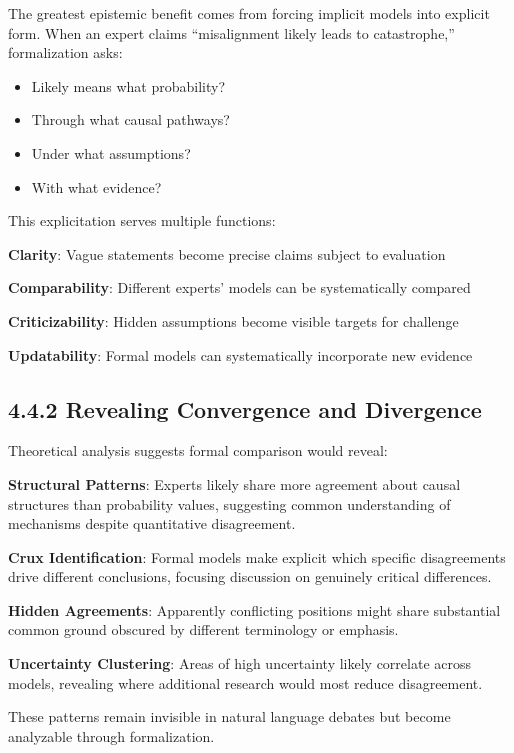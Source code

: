 \documentclass[
  11pt,
  letterpaper,
  openany]{book}
\providecommand{\tightlist}{%
  \setlength{\itemsep}{0pt}\setlength{\parskip}{0pt}}
\begin{document}
The greatest epistemic benefit comes from forcing implicit models into
explicit form. When an expert claims ``misalignment likely leads to
catastrophe,'' formalization asks:

\begin{itemize}
\tightlist
\item
  Likely means what probability?
\item
  Through what causal pathways?
\item
  Under what assumptions?
\item
  With what evidence?
\end{itemize}

This explicitation serves multiple functions:

\textbf{Clarity}: Vague statements become precise claims subject to
evaluation

\textbf{Comparability}: Different experts' models can be systematically
compared

\textbf{Criticizability}: Hidden assumptions become visible targets for
challenge

\textbf{Updatability}: Formal models can systematically incorporate new
evidence

\subsection{4.4.2 Revealing Convergence and
Divergence}\label{sec-convergence-divergence}

Theoretical analysis suggests formal comparison would reveal:

\textbf{Structural Patterns}: Experts likely share more agreement about
causal structures than probability values, suggesting common
understanding of mechanisms despite quantitative disagreement.

\textbf{Crux Identification}: Formal models make explicit which specific
disagreements drive different conclusions, focusing discussion on
genuinely critical differences.

\textbf{Hidden Agreements}: Apparently conflicting positions might share
substantial common ground obscured by different terminology or emphasis.

\textbf{Uncertainty Clustering}: Areas of high uncertainty likely
correlate across models, revealing where additional research would most
reduce disagreement.

These patterns remain invisible in natural language debates but become
analyzable through formalization.
\end{document}
